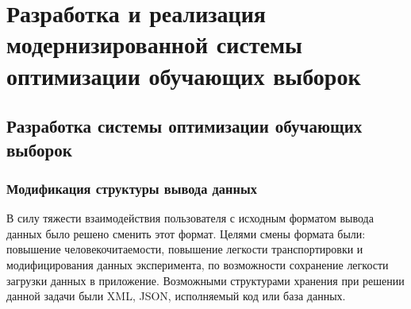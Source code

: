 \documentclass[utf8,usehyperref,14pt]{G7-32}
\begin{document}
\chapter{Разработка и реализация модернизированной системы оптимизации обучающих выборок}
\section{Разработка системы оптимизации обучающих выборок}
\subsection{Модификация структуры вывода данных}
\par{\normalsize В силу тяжести взаимодействия пользователя с исходным форматом вывода данных было решено сменить этот формат. Целями смены формата были: повышение человекочитаемости, повышение легкости транспортировки и модифицирования данных эксперимента, по возможности сохранение легкости загрузки данных в приложение.
Возможными структурами хранения при решении данной задачи были XML, JSON, исполняемый код или база данных.}
\end{document}
